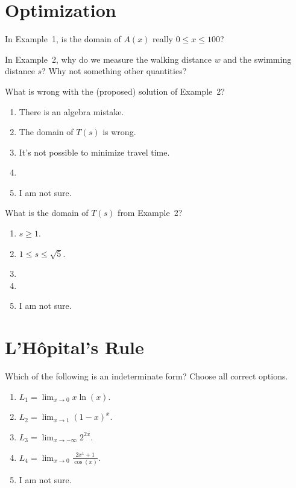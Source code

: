 \documentclass[14pt]{beamer}
\begin{document}
\section{Optimization}
\begin{frame}[c]
  In Example~1, is the domain of \(A(x)\) really \(0 \le x \le 100\)?
\end{frame}

\begin{frame}[c]
  In Example~2, why do we measure the walking distance \(w\) and the swimming distance \(s\)? Why not something other quantities?
\end{frame}

\begin{frame}[t]
  What is wrong with the (proposed) solution of Example~2?

  \medskip
  \begin{enumerate} \setlength\itemsep{1ex}
    \item There is an algebra mistake.
    \item The domain of \(T(s)\) is wrong.
    \item It's not possible to minimize travel time.
    \item 
    \item I am not sure.
  \end{enumerate} 
\end{frame}

\begin{frame}[t]
  What is the domain of \(T(s)\) from Example~2?

  \medskip
  \begin{enumerate} \setlength\itemsep{1ex}
    \item \(s \ge 1\). 
    \item \(1 \le s \le \sqrt{5}\). 
    \item 
    \item 
    \item I am not sure.
  \end{enumerate} 
\end{frame}

\section{L'H\^opital's Rule}
\begin{frame}[t]
  Which of the following is an indeterminate form? Choose all correct options.

  \medskip
  \begin{enumerate} \setlength\itemsep{1ex}
    \item \(L_{1} = \lim_{x \to 0} x \ln(x)\).
    \item \(L_{2} = \lim_{x \to 1} (1 - x)^{x}\).
    \item \(L_{3} = \lim_{x \to -\infty} 2^{2x}\).
    \item \(L_{4} = \lim_{x \to 0} \frac{2x^{1}+1}{\cos(x)}\).
    \item I am not sure.
  \end{enumerate} 
\end{frame}
\end{document}
